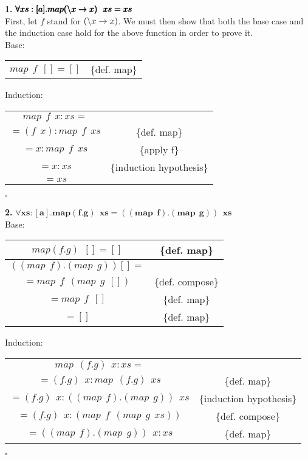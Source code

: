 \documentclass[12pt]{article}
\begin{document}


\textbf{1.} $\pmb{\forall xs:[a]. map (\char`\\ x \rightarrow x)~~xs = xs}$ \\
First, let $f$ stand for $(\char`\\ x \rightarrow x)$. We must then show that both the base case and the induction case hold for the above function in order to prove it. \\

Base:
\begin{center}
\begin{tabular}{cc}
$map~~f~~[] = []$ & \{def. map\}
\end{tabular}
\end{center}

Induction:
\begin{center}
\begin{tabular}{cc}
$map~~f~~x:xs = $ & {} \\
$= (f~~x):map~~f~~xs$ & \{def. map\} \\
$= x: map~~f~~xs$ & \{apply f\} \\
$= x:xs$ & \{induction hypothesis\} \\
$= xs$ & {}
\end{tabular}
\end{center}
$\square$

\textbf{2.} $\pmb{\forall xs:[a]. map (f.g)~~xs = ((map~~f).(map~~g))~~xs}$ \\
Base:
\begin{center}
\begin{tabular}{cc}
$map (f.g)~~[] = []$ & \{def. map\} \\
\hline
$((map~~f).(map~~g)) [] = $ & {} \\
$= map~~f~~(map~~g~~[])$ & \{def. compose\} \\
$= map~~f~~[]$ & \{def. map\} \\
$= []$ & \{def. map\} \\
\end{tabular}
\end{center}

Induction:
\begin{center}
\begin{tabular}{cc}
$map~~(f.g)~~x:xs = $ & {} \\
$= (f.g)~~x:map~~(f.g)~~xs$ & \{def. map\} \\
$= (f.g)~~x:((map~~f).(map~~g))~~xs$ & \{induction hypothesis\} \\
$= (f.g)~~x:(map~~f~~(map~~g~~xs))$ & \{def. compose\} \\
$= ((map~~f).(map~~g))~~x:xs$ & \{def. map\}
\end{tabular}
\end{center}
$\square$
\end{document}
